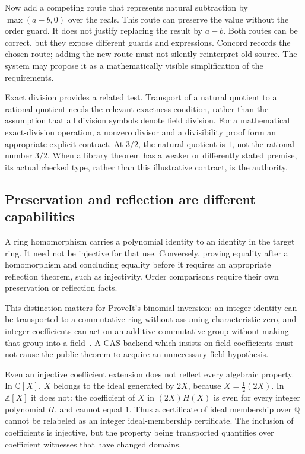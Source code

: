 \documentclass[11pt,a4paper]{article}
\newcommand{\Q}{\mathbb Q}
\newcommand{\Z}{\mathbb Z}
\theoremstyle{remark}
\begin{document}
Now add a competing route that represents natural subtraction by
$\max(a-b,0)$ over the reals. This route can preserve the value without the order
guard. It does not justify replacing the result by $a-b$. Both routes can be
correct, but they expose different guards and expressions. Concord records the
chosen route; adding the new route must not silently reinterpret old source.
The system may propose it as a mathematically visible simplification of the
requirements.

Exact division provides a related test. Transport of a natural quotient to a
rational quotient needs the relevant exactness condition, rather than the
assumption that all division symbols denote field division. For a mathematical
exact-division operation, a nonzero divisor and a divisibility proof form an
appropriate explicit contract. At $3/2$, the natural quotient is $1$, not the
rational number $3/2$. When a library theorem has a weaker or differently stated
premise, its actual checked type, rather than this illustrative contract, is the
authority.

\subsection{Preservation and reflection are different capabilities}
A ring homomorphism carries a polynomial identity to an identity in the target
ring. It need not be injective for that use. Conversely, proving equality after
a homomorphism and concluding equality before it requires an appropriate
reflection theorem, such as injectivity. Order comparisons require their own
preservation or reflection facts.

This distinction matters for ProveIt's binomial inversion: an integer identity
can be transported to a commutative ring without assuming characteristic zero,
and integer coefficients can act on an additive commutative group without making
that group into a field~\cite{pbinomial}. A CAS backend which insists on field
coefficients must not cause the public theorem to acquire an unnecessary field
hypothesis.

Even an injective coefficient extension does not reflect every algebraic
property. In $\Q[X]$, $X$ belongs to the ideal generated by $2X$, because
$X=\frac12(2X)$. In $\Z[X]$ it does not: the coefficient of $X$ in $(2X)H(X)$ is
even for every integer polynomial $H$, and cannot equal $1$. Thus a certificate
of ideal membership over $\Q$ cannot be relabeled as an integer ideal-membership
certificate. The inclusion of coefficients is injective, but the property being
transported quantifies over coefficient witnesses that have changed domains.
\end{document}
